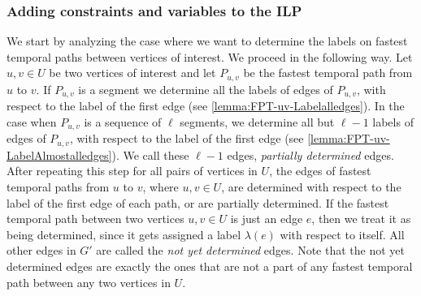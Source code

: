\documentclass[a4paper,UKenglish,cleveref, autoref, thm-restate]{lipics-v2021}
\begin{document}

\subsubsection{Adding constraints and variables to the ILP}\label{sec:constraints}
We start by analyzing the case where we want to determine the labels on fastest temporal paths between vertices of interest.
We proceed in the following way.
Let $u,v \in U$ be two vertices of interest and let $P_{u,v}$ be the fastest temporal path from $u$ to $v$.
If $P_{u,v}$ is a segment we determine all the labels of edges of $P_{u,v}$, with respect to the label of the first edge (see \cref{lemma:FPT-uv-Labelalledges}).
In the case when $P_{u,v}$ is a sequence of $\ell$ segments, we determine all but $\ell - 1$ labels of edges of $P_{u,v}$, with respect to the label of the first edge (see \cref{lemma:FPT-uv-LabelAlmostalledges}).
We call these $\ell - 1$ edges, \emph{partially determined} edges.
After repeating this step for all pairs of vertices in $U$,
the edges of fastest temporal paths from $u$ to $v$, where $u,v \in U$, are determined with respect to the label of the first edge of each path,
or are partially determined.
If the fastest temporal path between two vertices $u,v \in U$ is just an edge $e$, then we treat it as being determined, since it gets assigned a label $\lambda(e)$ with respect to itself.
All other edges in $G'$ %
are called the \emph{not yet determined} edges.
Note that the not yet determined edges are exactly the ones that are not a part of any fastest temporal path between any two vertices in $U$.
\end{document}
